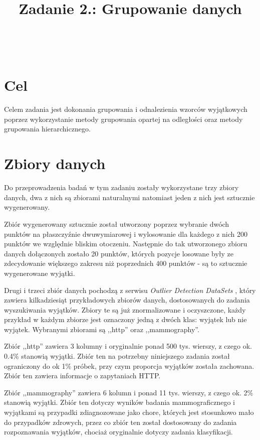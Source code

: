 \documentclass{classrep}
\author{%
    \studentinfo[239671@edu.p.lodz.pl]{Jan Karwowski}{239671}\\
    \studentinfo[239676@edu.p.lodz.pl]{Kamil Kowalewski}{239676}\\
}
\title{Zadanie 2.: Grupowanie danych}
\begin{document}
    \maketitle
    \thispagestyle{fancyplain}

    \tableofcontents
    \newpage

    \section{Cel} {
        Celem zadania jest dokonania grupowania i odnalezienia wzorców wyjątkowych
        poprzez wykorzystanie metody grupowania opartej na odległości oraz metody
        grupowania hierarchicznego.
    }

    \section{Zbiory danych} {
        Do przeprowadzenia badań w tym zadaniu zostały wykorzystane trzy zbiory danych,
        dwa z nich są zbiorami naturalnymi natomiast jeden z nich jest sztucznie
        wygenerowany.

        Zbiór wygenerowany sztucznie został utworzony poprzez wybranie dwóch punktów na
        płaszczyźnie dwuwymiarowej i wylosowanie dla każdego z nich 200 punktów we
        względnie bliskim otoczeniu. Następnie do tak utworzonego zbioru danych
        dołączonych zostało 20 punktów, których pozycje losowane były ze zdecydowanie
        większego zakresu niż poprzednich 400 punktów - są to sztucznie wygenerowane
        wyjątki.

        Drugi i trzeci zbiór danych pochodzą z serwisu \emph{Outlier Detection
        DataSets} \cite{odds}, który zawiera kilkadziesiąt przykładowych zbiorów
        danych, dostosowanych do zadania wyszukiwania wyjątków. Zbiory te są już
        znormalizowane i oczyszczone, każdy przykład w każdym zbiorze jest oznaczony
        jedną z dwóch klas: wyjątek lub nie wyjątek. Wybranymi zbiorami są ,,http''
        oraz ,,mammography''.

        Zbiór ,,http'' zawiera 3 kolumny i oryginalnie ponad 500 tys. wierszy, z czego
        ok. 0.4\% stanowią wyjątki. Zbiór ten na potrzebny niniejszego zadania został
        ograniczony do ok 1\% próbek, przy czym proporcja wyjątków została zachowana.
        Zbiór ten zawiera informacje o zapytaniach HTTP.

        Zbiór ,,mammography'' zawiera 6 kolumn i ponad 11 tys. wierszy, z czego ok. 2\%
        stanowią wyjątki. Zbiór ten dotyczy wyników badania mammograficznego i
        wyjątkami są przypadki zdiagnozowane jako chore, których jest stosunkowo mało
        do przypadków zdrowych, przez co zbiór ten został dostosowany do zadania
        rozpoznawania wyjątków, chociaż oryginalnie dotyczy zadania klasyfikacji.
    }
\end{document}
